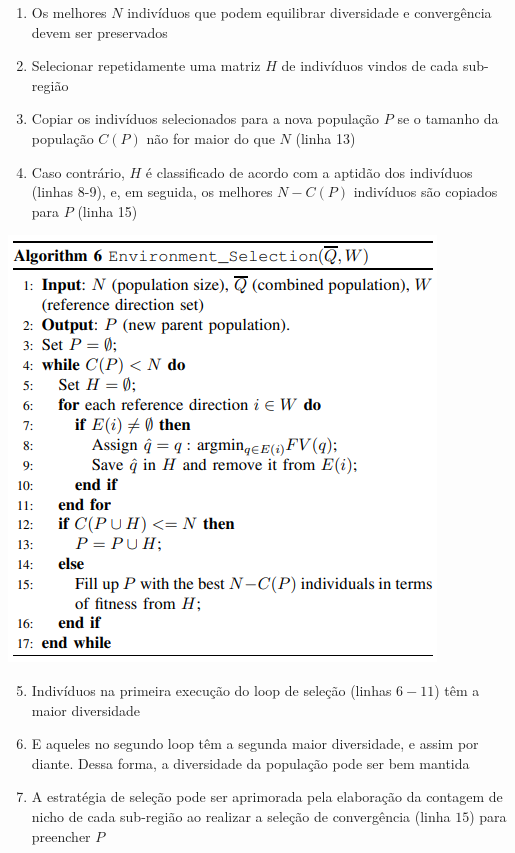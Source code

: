 \documentclass{rbfin}
\begin{document}
\begin{enumerate}[label=(\arabic*), itemsep=0mm]
  \item Os melhores $N$ indivíduos que podem equilibrar diversidade e convergência devem ser preservados
  \item Selecionar repetidamente uma matriz $H$ de indivíduos vindos de cada sub-região
  \item Copiar os indivíduos selecionados para a nova população $P$ se o tamanho da população $C(P)$ não for maior do que $N$ (linha 13)
  \item Caso contrário, $H$ é classificado de acordo com a aptidão dos indivíduos (linhas 8-9), e, em seguida, os melhores $N - C(P)$ indivíduos são copiados para $P$ (linha 15)
\end{enumerate}

\begin{center}
\includegraphics[scale=1]{alg6}
\end{center}

\begin{enumerate}[label=(\arabic*), itemsep=0mm]
  \setcounter{enumi}{4}
  \item Indivíduos na primeira execução do loop de seleção (linhas $6-11$) têm a maior diversidade
  \item E aqueles no segundo loop têm a segunda maior diversidade, e assim por diante. Dessa forma, a diversidade da população pode ser bem mantida
  \item A estratégia de seleção pode ser aprimorada pela elaboração da contagem de nicho de cada sub-região ao realizar a seleção de convergência (linha $15$) para preencher $P$
\end{enumerate}
\end{document}
